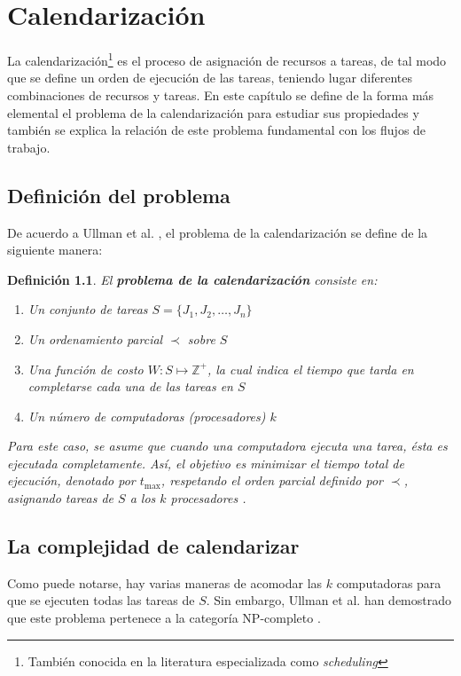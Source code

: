 \documentclass[letterpaper, 12pt]{report}
\newtheorem{defn}{Definición}
\begin{document}
\chapter{Calendarización}
La calendarización\footnote{También conocida en la literatura especializada como \emph{scheduling}} es el proceso de asignación de recursos a tareas, de tal modo que se define un orden de ejecución de las tareas, teniendo lugar diferentes combinaciones de recursos y tareas. En este capítulo se define de la forma más elemental el problema de la calendarización para estudiar sus propiedades y también se explica la relación de este problema fundamental con los flujos de trabajo.

\section{Definición del problema}
De acuerdo a  Ullman et al. \cite{ullman1975np}, el problema de la calendarización se define de la siguiente manera: 

\begin{defn}
El \textbf{problema de la calendarización} consiste en:
\begin{enumerate}
\item Un conjunto de tareas $S = \{ J_1, J_2, \dots, J_n \}$
\item Un ordenamiento parcial $\prec$ sobre $S$
\item Una función de costo $W: S \mapsto \mathbb{Z}^{+}$, la cual indica el tiempo que tarda en completarse cada una de las tareas en $S$
\item Un número de computadoras (procesadores) $k$
\end{enumerate}
Para este caso, se asume que cuando una computadora ejecuta una tarea, ésta es ejecutada completamente. Así, el objetivo es \emph{minimizar} el tiempo total de ejecución, denotado por $t_\text{max}$, respetando el orden parcial definido por $\prec$, asignando tareas de $S$ a los $k$ procesadores	.
\end{defn}


\section{La complejidad de calendarizar}
Como puede notarse, hay varias maneras de acomodar las $k$ computadoras para que se ejecuten todas las tareas de $S$. Sin embargo, Ullman et al. han demostrado que este problema pertenece a la categoría NP-completo \cite{ullman1975np}.
\end{document}

